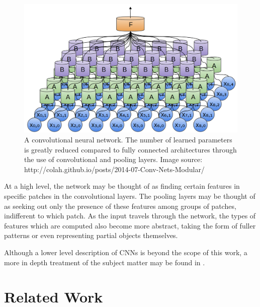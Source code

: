 \documentclass[letterpaper, 12 pt, conference]{ieeeconf}  %
\begin{document}
\begin{figure}[h]
\centering
\includegraphics[scale=0.35]{cnn}
\caption{A convolutional neural network. The number of learned parameters is greatly reduced compared to fully connected architectures through the use of convolutional and pooling layers. Image source: http://colah.github.io/posts/2014-07-Conv-Nets-Modular/}
\end{figure}

At a high level, the network may be thought of as finding certain features in specific patches in the convolutional layers. The pooling layers may be thought of as seeking out only the presence of these features among groups of patches, indifferent to which patch. As the input travels through the network, the types of features which are computed also become more abstract, taking the form of fuller patterns or even representing partial objects themselves. 
\par
Although a lower level description of CNNs is beyond the scope of this work, a more in depth treatment of the subject matter may be found in \cite{deeplearningbook, AlexNet}. 
 

\section{Related Work}
\end{document}
